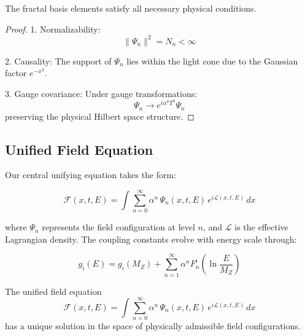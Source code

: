 \documentclass{article}
\begin{document}
\begin{theorem}
The fractal basis elements satisfy all necessary physical conditions.
\end{theorem}

\begin{proof}
1. Normalizability:
   \[
   \|\Psi_n\|^2 = N_n < \infty
   \]

2. Causality:
   The support of $\Psi_n$ lies within the light cone due to the Gaussian factor $e^{-x^2}$.

3. Gauge covariance:
   Under gauge transformations:
   \[
   \Psi_n \to e^{i\alpha^a T^a}\Psi_n
   \]
   preserving the physical Hilbert space structure.
\end{proof}

\subsection{Unified Field Equation}

Our central unifying equation takes the form:

\begin{equation}
\mathcal{F}(x, t, E) = \int \sum_{n=0}^{\infty} \alpha^n \, \Psi_n(x, t, E) \, e^{i \mathcal{L}(x, t, E)} \, dx
\end{equation}

where $\Psi_n$ represents the field configuration at level $n$, and $\mathcal{L}$ is the effective Lagrangian density. The coupling constants evolve with energy scale through:

\begin{equation}
g_i(E) = g_i(M_Z) + \sum_{n=1}^{\infty} \alpha^n F_n^i\left(\ln\frac{E}{M_Z}\right)
\end{equation}

\begin{theorem}
The unified field equation
\[
\mathcal{F}(x, t, E) = \int \sum_{n=0}^{\infty} \alpha^n \, \Psi_n(x, t, E) \, e^{i \mathcal{L}(x, t, E)} \, dx
\]
has a unique solution in the space of physically admissible field configurations.
\end{theorem}
\end{document}
